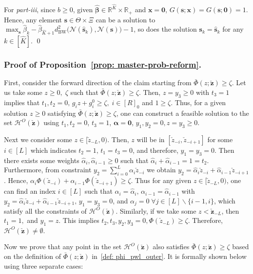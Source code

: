 \documentclass[opre,sglanonrev]{informs4}
\newcommand{\mN}{\mathcal{N}}
\newcommand{\mH}{\mathcal{H}}
\newcommand{\mbR}{\mathbb R}
\newcommand{\zz}{\check{z}}
\newcommand{\bzz}{\bm{\zz}}
\newcommand{\bbeta}{\bm{\beta}}
\newcommand{\balpha}{\bm{\alpha}}
\newcommand{\bzero}{\bm{0}}
\newcommand{\bs}{\bm{s}}
\newcommand{\bx}{\bm{x}}
\begin{document}
{\begin{APPENDICES}
For \emph{part-iii}, since $ b \geq 0$, given $\hat{\bbeta} \in \mbR^{\hat{K}} \times \mbR_+$ and $\bx = \bzero$, $G(\bs; \bx) = G(\bs; \bzero) = 1$. Hence, any element $\bs \in \Theta \times \Xi$ can be a solution to $\max_{\bs} \hat{\beta}_k - \hat{\beta}_{\hat{K}+1} d^2_{\mathrm{BW}} \big(\mN(\hat{\bs}_k), \mN(\bs) \big) -  1 $, so does the solution $\bs_k = \hat{\bs}_k $ for any $ k \in [\hat{K}]$. \hfill \qed

\subsubsection{Proof of Proposition~\ref{prop: master-prob-reform}. }
First, consider the forward direction of the claim starting from $\bar{\Phi} \left(z ; \bzz\right)  \geq \zeta$. Let us take some $z\geq 0, \; \zeta$ such that $\bar{\Phi}(z; \bzz) \geq \zeta$. Then, $z = y_3 \geq 0$ with $t_3 = 1$ implies that $t_1, t_2 = 0, \, g_i z + g_i^0 \geq \zeta, \; i \in [R]_0$ and $1 \geq \zeta$. Thus, for a given solution $z \geq 0$ satisfying $\bar{\Phi}(z; \bzz) \geq \zeta$, one can construct a feasible solution to the set $\mH^O(\bzz)$ using $t_1, t_2 = 0$, $t_3 = 1$, $\balpha = \bzero$, $y_1, y_2 = 0, z = y_3 \geq 0$. 

Next we consider some $z \in [\check{z}_{-L},  0)$. Then, $z$ will be in $[\check{z}_{-i}, \check{z}_{-i+1}]$ for some $i \in [L]$ which indicates $t_2 = 1, \, t_1 = t_3 = 0$, and therefore, $y_1 = y_3 = 0$. Then there exists some weights $\hat{\alpha}_i, \hat{\alpha}_{i-1} \geq 0$ such that $\hat{\alpha}_i + \hat{\alpha}_{i-1} = 1 = t_2$. Furthermore, from constraint $y_2 = \sum_{i=0}^L \alpha_i \zz_{-i}$ we obtain $y_2 = \hat{\alpha}_i \check{z}_{-i} +  \hat{\alpha}_{i-1} \check{z}_{-i+1}$. Hence, $ \alpha_{i} \Phi(\zz_{-i}) + \alpha_{i-1} \Phi(\zz_{-i+1}) \geq \zeta$. Thus for any given $z \in [\check{z}_{-L},  0)$, one can find an index $i \in [L]$ such that $ \alpha_i = \hat{\alpha}_i, \, \alpha_{i-1} = \hat{\alpha}_{i-1}$ with $y_2 = \hat{\alpha}_i \check{z}_{-i} +  \hat{\alpha}_{i-1} \check{z}_{-i+1}, \, y_1 = y_3 = 0$, and  $\alpha_j = 0 \;\forall j \in [L] \backslash \{i-1, i\}$, which satisfy all the constraints of $\mH^O(\bzz)$. Similarly, if we take some $z < \bzz_{-L}$, then $t_1 = 1,$ and $y_1 = z$. This implies $t_2, t_3, y_2, y_3 = 0, \Phi(\check{z}_{-L}) \geq  \zeta$. Therefore, $\mH^O(\bzz) \neq \emptyset$.

\vspace{1em}
Now we prove that any point in the set $\mH^O(\bzz)$ also satisfies $\bar{\Phi} \left(z ; \bzz\right)  \geq \zeta$ based on the definition of  $\bar{\Phi} \left(z ; \bzz\right)$ in~\eqref{def: phi_pwl_outer}. It is formally shown below using three separate cases:


\end{APPENDICES}}
\end{document}

